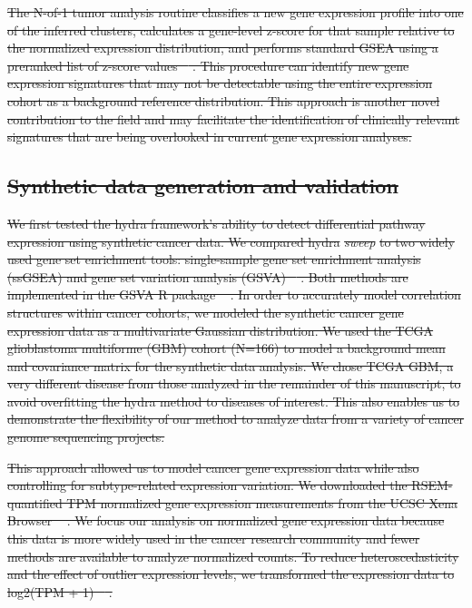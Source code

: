 \documentclass[10pt,letterpaper]{article}
\providecommand{\DIFdeltex}[1]{{\protect\color{red}\sout{#1}}}                      %
\providecommand{\DIFdel}[1]{\texorpdfstring{\DIFdeltex{#1}}{}} %
\begin{document}
\DIFdel{The N-of-1 tumor analysis routine classifies a new gene expression profile into one of the inferred clusters, calculates a gene-level z-score for that sample relative to the normalized expression distribution, and performs standard GSEA using a preranked list of z-score values \mbox{%
\cite{korotkevichFastGeneSet2019}}\hspace{0pt}%
. This procedure can identify new gene expression signatures that may not be detectable using the entire expression cohort as a background reference distribution. This approach is another novel contribution to the field and may facilitate the identification of clinically relevant signatures that are being overlooked in current gene expression analyses.
}%

\subsection*{\DIFdel{Synthetic data generation and validation}}
\DIFdel{We first tested the hydra framework’s ability to detect differential pathway expression using synthetic cancer data. We compared hydra }\textit{\DIFdel{sweep}} %
\DIFdel{to two widely used gene set enrichment tools: single-sample gene set enrichment analysis (ssGSEA) and gene set variation analysis (GSVA) \mbox{%
\cite{barbieSystematicRNAInterference2009, hanzelmannGSVAGeneSet2013, tarcaComparisonGeneSet2013}}\hspace{0pt}%
. Both methods are implemented in the GSVA R package \mbox{%
\cite{hanzelmannGSVAGeneSet2013}}\hspace{0pt}%
. In order to accurately model correlation structures within cancer cohorts, we modeled the synthetic cancer gene expression data as a multivariate Gaussian distribution. We used the TCGA glioblastoma multiforme (GBM) cohort (N=166) to model a background mean and covariance matrix for the synthetic data analysis. We chose TCGA GBM, a very different disease from those analyzed in the remainder of this manuscript, to avoid overfitting the hydra method to diseases of interest. This also enables us to demonstrate the flexibility of our method to analyze data from a variety of cancer genome sequencing projects.
}%

\DIFdel{This approach allowed us to model cancer gene expression data while also controlling for subtype-related expression variation. We downloaded the RSEM-quantified TPM normalized gene expression measurements from the UCSC Xena Browser \mbox{%
\cite{goldmanUCSCXenaPlatform2018}}\hspace{0pt}%
. We focus our analysis on normalized gene expression data because this data is more widely used in the cancer research community and fewer methods are available to analyze normalized counts. To reduce heteroscedasticity and the effect of outlier expression levels, we transformed the expression data to log2(TPM + 1) \mbox{%
\cite{zwienerTransformingRNASeqData2014}}\hspace{0pt}%
.
}%
\end{document}
